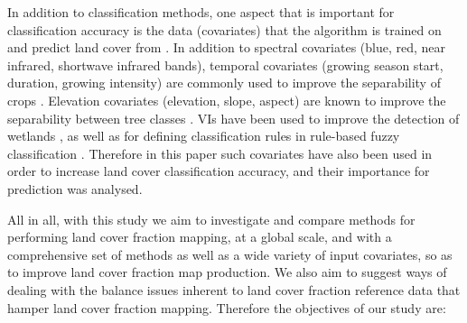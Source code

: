 \documentclass[a4paper,10pt]{article}
\begin{document}


In addition to classification methods, one aspect that is important for classification accuracy is the data (covariates) that the algorithm is trained on and predict land cover from \citep{yu2014metadiscoveries}. In addition to spectral covariates (blue, red, near infrared, shortwave infrared bands), temporal covariates (growing season start, duration, growing intensity) are commonly used to improve the separability of crops \citep{jakubauskas2001harmonic}. Elevation covariates (elevation, slope, aspect) are known to improve the separability between tree classes \citep{burrough2001fuzzy}. \Glspl{VI} have been used to improve the detection of wetlands \citep{sader1995wetlands}, as well as for defining classification rules in rule-based fuzzy classification \citep{baraldi2006rulebased}. Therefore in this paper such covariates have also been used in order to increase land cover classification accuracy, and their importance for prediction was analysed.

All in all, with this study we aim to investigate and compare methods for performing land cover fraction mapping, at a global scale, and with a comprehensive set of methods as well as a wide variety of input covariates, so as to improve land cover fraction map production.
We also aim to suggest ways of dealing with the balance issues inherent to land cover fraction reference data that hamper land cover fraction mapping.
Therefore the objectives of our study are:
\end{document}
